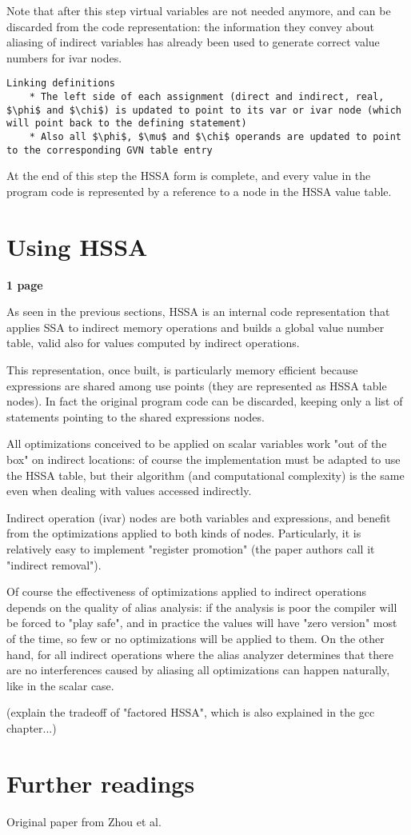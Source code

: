 Note that after this step virtual variables are not needed anymore, and can be discarded from the code representation: the information they convey about aliasing of indirect variables has already been used to generate correct value numbers for ivar nodes.

\begin{verbatim}
Linking definitions
    * The left side of each assignment (direct and indirect, real, $\phi$ and $\chi$) is updated to point to its var or ivar node (which will point back to the defining statement)
    * Also all $\phi$, $\mu$ and $\chi$ operands are updated to point to the corresponding GVN table entry
\end{verbatim}

At the end of this step the HSSA form is complete, and every value in the program code is represented by a reference to a node in the HSSA value table.

\section{Using HSSA}
\textbf{1 page}

As seen in the previous sections, HSSA is an internal code representation that applies SSA to indirect memory operations and builds a global value number table, valid also for values computed by indirect operations.


This representation, once built, is particularly memory efficient because expressions are shared among use points (they are represented as HSSA table nodes). In fact the original program code can be discarded, keeping only a list of statements pointing to the shared expressions nodes.

All optimizations conceived to be applied on scalar variables work "out of the box" on indirect locations: of course the implementation must be adapted to use the HSSA table, but their algorithm (and computational complexity) is the same even when dealing with values accessed indirectly.

Indirect operation (ivar) nodes are both variables and expressions, and benefit from the optimizations applied to both kinds of nodes. Particularly, it is relatively easy to implement "register promotion" (the paper authors call it "indirect removal").

Of course the effectiveness of optimizations applied to indirect operations depends on the quality of alias analysis: if the analysis is poor the compiler will be forced to "play safe", and in practice the values will have "zero version" most of the time, so few or no optimizations will be applied to them.
On the other hand, for all indirect operations where the alias analyzer determines that there are no interferences caused by aliasing all optimizations can happen naturally, like in the scalar case.

(explain the tradeoff of "factored HSSA", which is also explained in the gcc chapter...)



\section{Further readings}
Original paper from Zhou et al. \cite{ZhouCC11}
